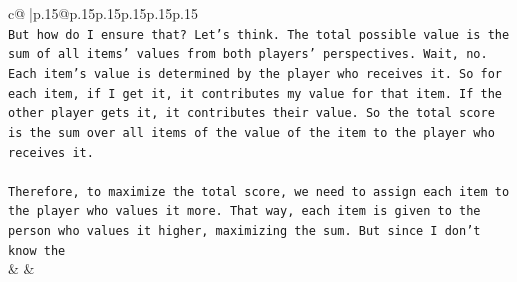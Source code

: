 \documentclass{article}
\begin{document}
{\begin{supertabular}{c@{$\;$}|p{.15\linewidth}@{}p{.15\linewidth}p{.15\linewidth}p{.15\linewidth}p{.15\linewidth}p{.15\linewidth}}
{{{\\ 
\texttt{But how do I ensure that? Let's think. The total possible value is the sum of all items' values from both players' perspectives. Wait, no. Each item's value is determined by the player who receives it. So for each item, if I get it, it contributes my value for that item. If the other player gets it, it contributes their value. So the total score is the sum over all items of the value of the item to the player who receives it.} \\
\\ 
\texttt{Therefore, to maximize the total score, we need to assign each item to the player who values it more. That way, each item is given to the person who values it higher, maximizing the sum. But since I don't know the} \\
            }
        }
    }
    & & \\ \\


\end{supertabular}}
\end{document}
